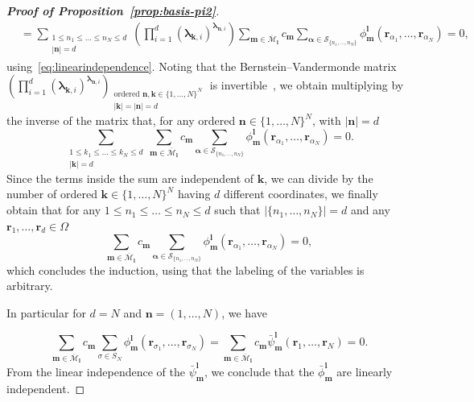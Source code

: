 \documentclass{article}
\newcommand{\blamb}[2]{\bm\lambda^{#1}_{#2}}
\newcommand{\bphi}[2]{\bar\phi^{#1}_{#2}}
\newcommand{\bpsi}[2]{\bar\psi^{#1}_{#2}}
\newcommand{\card}[1]{|{#1}|}
\numberwithin{equation}{section}
\def\br{{\bm r}}
\def\bk{{\bm k}}
\def\bl{{\bm l}}
\def\bbm{{\bm m}}
\def\bn{{\bm n}}
\def\calM{\mathcal{M}}
\def\calS{\mathcal{S}}
\def\oMl{\overline{\calM}_\bl}
\def\Nat{{N}}
\begin{document}
\begin{proof}[\bf{Proof of Proposition~\ref{prop:basis-pi2}}]
\begin{align*}
    &=\displaystyle\sum_{\substack{1\le n_1\le\ldots\le n_\Nat\le d\\\card{\bn}=d}}\left(\prod_{i=1}^{d} (\blamb{}{\bk,i})^{\blamb{}{\bn,i}}\right)\displaystyle\sum_{\bbm \in\oMl}c_\bbm\sum_{\bm{\alpha}\in \calS_{\{n_1,\ldots,n_\Nat\}}}\phi^\bl_\bbm
    (\br_{\alpha_1}, \ldots, \br_{\alpha_\Nat}) = 0,
\end{align*}
using~\eqref{eq:linearindependence}.
Noting that the Bernstein--Vandermonde matrix $\displaystyle\left(\prod_{i=1}^{d} (\blamb{}{\bk,i})^{\blamb{}{\bn,i}}\right)_{\substack{\text{ordered } \bn,\bk\in\{1,\ldots,\Nat\}^\Nat\\\card{\bk}=\card{\bn}=d}}$ is invertible~\cite[(2.10)]{Ainsworth2011-pk}, 
we obtain multiplying by the inverse of the matrix that, for any ordered $\bn\in\{1,\ldots,\Nat\}^\Nat$, with $\card{\bn}=d$ 
\[
    \displaystyle\sum_{\substack{1\le k_1\le\ldots\le k_\Nat\le d\\\card{\bk}=d}}\displaystyle\sum_{\bbm \in\oMl}
    c_\bbm\sum_{\bm{\alpha}\in \calS_{\{n_1,\ldots,n_\Nat\}}}\phi^\bl_\bbm
    (\br_{\alpha_1}, \ldots, \br_{\alpha_\Nat})=0.
\]
Since the terms inside the sum are independent of $\bk$, we can divide by the number of ordered $\bk\in\{1,\ldots,\Nat\}^\Nat$ having $d$ different coordinates, we finally obtain that for any $1\le n_1\le\ldots\le n_\Nat\le d$ such that $\card{\{n_1,\ldots,n_\Nat \}  }=d$ and any $\br_1,\ldots,\br_d \in \Omega$
\[
  \displaystyle\sum_{\bbm \in\oMl}c_\bbm\sum_{\bm{\alpha}\in \calS_{\{n_1,\ldots,n_\Nat\}}}\phi^\bl_\bbm
    (\br_{\alpha_1}, \ldots, \br_{\alpha_\Nat})=0,
\]
which concludes the induction, using that the labeling of the variables is arbitrary.


In particular for $d=\Nat$ and $\bn=(1,\ldots,\Nat)$, we have

\[
    \displaystyle\sum_{\bbm \in\oMl}c_\bbm  \displaystyle\sum_{\sigma\in S_\Nat}\phi^\bl_\bbm\left(\br_{\sigma_1},\ldots,\br_{\sigma_\Nat}\right)
    = \displaystyle\sum_{\bbm \in\oMl}c_\bbm \bpsi{\bl}{\bbm}(\br_{1},\ldots,\br_{\Nat})=0.
\]
From the linear independence of the $\bpsi{\bl}{\bbm}$, we conclude that the $\bphi{\bl}{\bbm}$ are linearly independent.
\end{proof}
\end{document}
